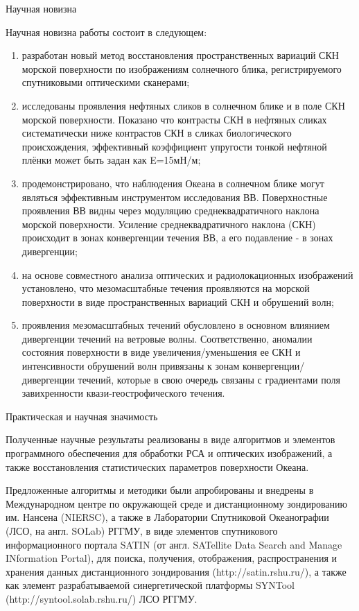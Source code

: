  Научная новизна

Научная новизна работы состоит в следующем:

\begin{enumerate}
\item  разработан новый метод восстановления пространственных вариаций СКН морской поверхности по изображениям солнечного блика, регистрируемого спутниковыми оптическими сканерами;

\item  исследованы проявления нефтяных сликов в солнечном блике и в поле СКН морской поверхности. Показано что контрасты СКН в нефтяных сликах систематически ниже контрастов СКН в сликах биологического происхождения, эффективный коэффициент упругости тонкой нефтяной плёнки может быть задан как E=15мН/м;

\item  продемонстрировано, что наблюдения Океана в солнечном блике могут являться эффективным инструментом исследования ВВ. Поверхностные проявления ВВ видны через модуляцию среднеквадратичного наклона морской поверхности. Усиление среднеквадратичного наклона (СКН) происходит в зонах конвергенции течения ВВ, а его подавление - в зонах дивергенции;

\item  на основе совместного анализа оптических и радиолокационных изображений установлено, что мезомасштабные течения проявляются на морской поверхности в виде пространственных вариаций СКН и обрушений волн;

\item  проявления мезомасштабных течений обусловлено в основном влиянием дивергенции течений на ветровые волны. Соответственно, аномалии состояния поверхности в виде увеличения/уменьшения ее СКН и интенсивности обрушений волн привязаны к зонам конвергенции/дивергенции течений, которые в свою очередь связаны с градиентами поля завихренности квази-геострофического течения.
\end{enumerate}

 Практическая и научная значимость

Полученные научные результаты реализованы в виде алгоритмов и элементов программного обеспечения для обработки РСА и оптических изображений, а также восстановления статистических параметров поверхности Океана.

Предложенные алгоритмы и методики были апробированы и внедрены в Международном центре по окружающей среде и дистанционному зондированию им. Нансена (NIERSC), а также в Лаборатории Спутниковой Океанографии (ЛСО, на англ. SOLab) РГГМУ, в виде элементов спутникового информационного портала SATIN (от англ. SATellite Data Search and Manage INformation Portal), для поиска, получения, отображения, распространения и хранения данных дистанционного зондирования (http://satin.rshu.ru/), а также как элемент разрабатываемой синергетической платформы SYNTool (http://syntool.solab.rshu.ru/) ЛСО РГГМУ.


